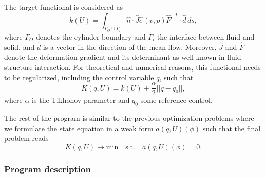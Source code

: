 The target functional is considered as 
\[
k(U) = \int_{\hat\Gamma_O \cup \hat\Gamma_i} \hat n\cdot \hat J\hat\sigma(v,p)\hat
F^{-T} \cdot \hat d \, ds,
\]
where $\Gamma_O$ denotes the cylinder boundary and $\Gamma_i$ the 
interface between fluid and solid, and $\hat d$ is a vector in the
direction
of the mean flow. Moreover, $\hat J$ and $\hat F$ denote the deformation 
gradient and its determinant as well known in fluid-structure interaction.
For theoretical and numerical reasons, this functional 
needs to be regularized, including the control variable $q$, such that
\[
K(q,U) = k(U) + \frac{\alpha}{2}||q - q_0||,
\] 
where $\alpha$ is the Tikhonov parameter and $q_0$ some 
reference control. 

The rest of the program is similar to the previous optimization problems where
we formulate the state equation in a weak form $a(q,U)(\phi)$ such that the 
final problem reads
\[
K(q,U) \rightarrow \text{min} \quad \text{s.t.} \quad a(q,U)(\phi) = 0.
\]

\subsubsection{Program description}





